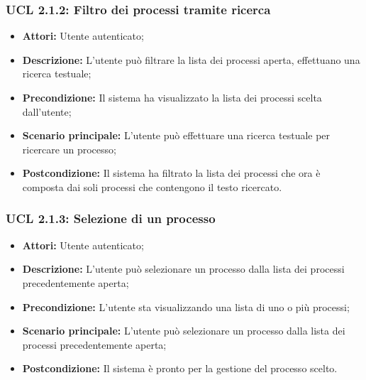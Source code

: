 \hypertarget{L2.1.2}{}
\subsubsection{UCL 2.1.2: Filtro dei processi tramite ricerca}
\begin{itemize}
\item \textbf{Attori:} Utente autenticato;
\item \textbf{Descrizione:} L'utente può filtrare la lista dei processi aperta, effettuano una ricerca testuale;
\item \textbf{Precondizione:} Il sistema ha visualizzato la lista dei processi scelta dall'utente;
\item \textbf{Scenario principale:} L'utente può effettuare una ricerca testuale per ricercare un processo;
\item \textbf{Postcondizione:} Il sistema ha filtrato la lista dei processi che ora è composta dai soli processi che contengono il testo ricercato.
\end{itemize}

\hypertarget{L2.1.3}{}
\subsubsection{UCL 2.1.3: Selezione di un processo}
\begin{itemize}
\item \textbf{Attori:} Utente autenticato;
\item \textbf{Descrizione:} L'utente può selezionare un processo dalla lista dei processi precedentemente aperta;
\item \textbf{Precondizione:} L'utente sta visualizzando una lista di uno o più processi;
\item \textbf{Scenario principale:} L'utente può selezionare un processo dalla lista dei processi precedentemente aperta;
\item \textbf{Postcondizione:} Il sistema è pronto per la gestione del processo scelto.
\end{itemize}

